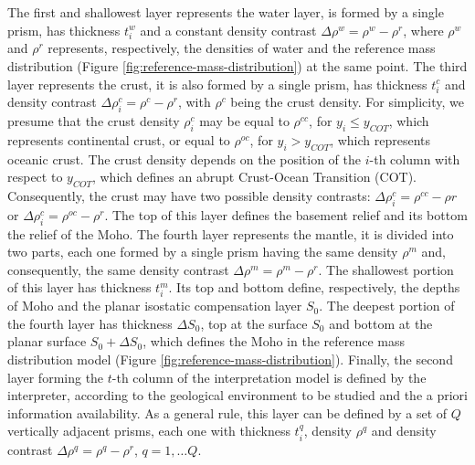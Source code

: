 \documentclass[manuscript]{geophysics}
\begin{document}
The first and shallowest layer represents the water layer, 
is formed by a single prism, has thickness $t^{w}_{i}$ and a constant density contrast 
$\Delta \rho^{w} = \rho^{w} - \rho^{r}$, where $\rho^{w}$ and $\rho^{r}$ 
represents, respectively, the densities of water and the reference mass 
distribution (Figure \ref{fig:reference-mass-distribution}) at the same point.
The third layer represents the crust, it is also formed by a single prism,
has thickness $t^{c}_{i}$ and density contrast 
$\Delta \rho^{c}_{i} = \rho^{c} - \rho^{r}$, 
with $\rho^{c}$ being the crust density. For simplicity, we presume that the crust
density $\rho^{c}_{i}$ may be equal to $\rho^{cc}$, for $y_{i} \le y_{COT}$, which
represents continental crust,
or equal to $\rho^{oc}$, for $y_{i} > y_{COT}$, which represents oceanic crust.
The crust density depends on the position of the $i$-th column with respect to
$y_{COT}$, which defines an abrupt Crust-Ocean Transition (COT). Consequently, the
crust may have two possible density contrasts: 
$\Delta \rho^{c}_{i} = \rho^{cc} - \rho{r}$ or 
$\Delta \rho^{c}_{i} = \rho^{oc} - \rho^{r}$. The top of this layer defines the 
basement relief and its bottom the relief of the Moho. The fourth layer represents the
mantle, it is divided into two parts, each one formed by a single prism having the same
density $\rho^{m}$ and, consequently, the same density contrast 
$\Delta \rho^{m} = \rho^{m} - \rho^{r}$. The shallowest
portion of this layer has thickness $t^{m}_{i}$. Its top and bottom define,
respectively, the depths of Moho and the planar isostatic compensation layer $S_{0}$.
The deepest portion of the fourth layer has thickness $\Delta S_{0}$, top at the
surface $S_{0}$ and bottom at the planar surface 
$S_{0} + \Delta S_{0}$, which defines the Moho in the reference mass distribution model 
(Figure \ref{fig:reference-mass-distribution}). Finally, the second layer forming the
$t$-th column of the interpretation model is defined by the interpreter, according to
the geological environment to be studied and the a priori information availability. 
As a general rule, this layer can be defined by a set of $Q$ vertically adjacent
prisms, each one with thickness $t^{q}_{i}$, density $\rho^{q}$ and density contrast
$\Delta \rho^{q} = \rho^{q} - \rho^{r}$, $q = 1, \dots Q$.
\end{document}
